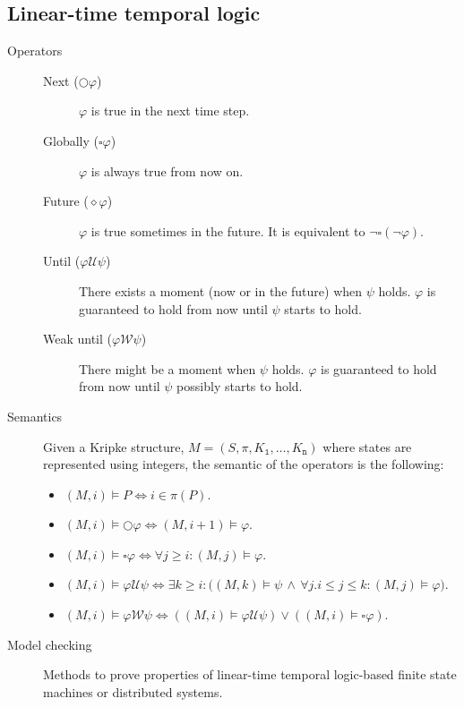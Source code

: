 \subsection{Linear-time temporal logic}

\begin{description}
    \item[Operators] \phantom{}
        \begin{description}
            \item[Next ($\bigcirc \varphi$)] 
                $\varphi$ is true in the next time step.

            \item[Globally ($\square \varphi$)] 
                $\varphi$ is always true from now on.

            \item[Future ($\diamond \varphi$)] 
                $\varphi$ is true sometimes in the future.
                It is equivalent to $\lnot\square(\lnot \varphi)$.

            \item[Until ($\varphi \mathcal{U} \psi$)] 
                There exists a moment (now or in the future) when $\psi$ holds. 
                $\varphi$ is guaranteed to hold from now until $\psi$ starts to hold.

            \item[Weak until ($\varphi \mathcal{W} \psi$)] 
                There might be a moment when $\psi$ holds. 
                $\varphi$ is guaranteed to hold from now until $\psi$ possibly starts to hold.
        \end{description}

    \item[Semantics]
        Given a Kripke structure, $M = (S, \pi, K_\texttt{1}, \dots, K_\texttt{n})$ where states are represented using integers,
        the semantic of the operators is the following:
        \begin{itemize}
            \item $(M, i) \models P \iff i \in \pi(P)$.
            \item $(M, i) \models \bigcirc\varphi \iff (M, i+1) \models \varphi$.
            \item $(M, i) \models \square\varphi \iff \forall j \geq i: (M, j) \models \varphi$.
            \item $(M, i) \models \varphi \mathcal{U} \psi \iff \exists k \geq i: \big( (M, k) \models \psi \,\land\, \forall j. i \leq j \leq k: (M, j) \models \varphi \big)$.
            \item $(M, i) \models \varphi \mathcal{W} \psi \iff ((M, i) \models \varphi \mathcal{U} \psi) \vee ((M, i) \models \square\varphi)$.
        \end{itemize}

    \item[Model checking] 
        Methods to prove properties of linear-time temporal logic-based finite state machines or distributed systems.
\end{description}